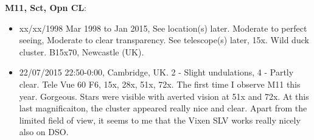 {\bf M11, Sct, Opn CL}:
\begin{itemize}
\item xx/xx/1998 Mar 1998 to Jan 2015, See location(s) later. Moderate to perfect seeing, Moderate to clear transparency. See telescope(s) later, 15x. Wild duck cluster. B15x70, Newcastle (UK).
\item 22/07/2015 22:50-0:00, Cambridge, UK. 2 - Slight undulations, 4 - Partly clear. Tele Vue 60 F6, 15x, 28x, 51x, 72x. The first time I observe M11 this year. Gorgeous. Stars were visible with averted vision at 51x and 72x. At this last magnificaiton, the cluster appeared really nice and clear. Apart from the limited field of view, it seems to me that the Vixen SLV works really nicely also on DSO.
\end{itemize}
